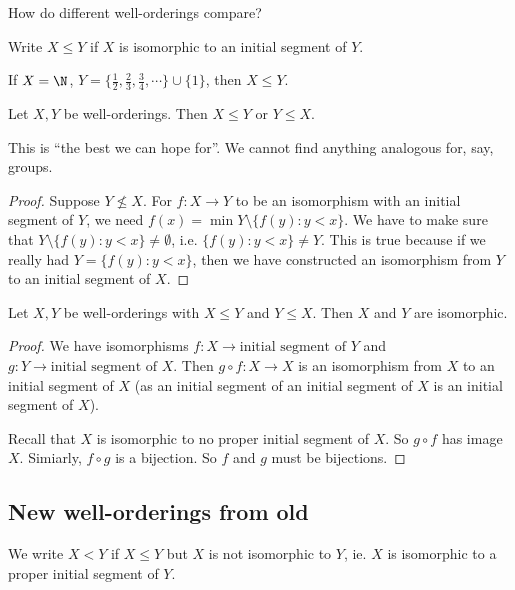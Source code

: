 \documentclass[a4paper]{article}
\begin{document}
How do different well-orderings compare?
\begin{notation}
  Write $X\leq Y$ if $X$ is isomorphic to an initial segment of $Y$.
\end{notation}

\begin{eg}
  If $X = \N$, $Y = \{\frac{1}{2}, \frac{2}{3}, \frac{3}{4},\cdots\}\cup \{1\}$, then $X \leq Y$.
\end{eg}

\begin{thm}
  Let $X, Y$ be well-orderings. Then $X\leq Y$ or $Y \leq X$.

  This is ``the best we can hope for''. We cannot find anything analogous for, say, groups.
\end{thm}

\begin{proof}
  Suppose $Y \not\leq X$. For $f: X\to Y$ to be an isomorphism with an initial segment of $Y$, we need $f(x) = \min Y\setminus \{f(y): y < x\}$. We have to make sure that $Y\setminus \{f(y): y < x\}\not= \emptyset$, i.e. $\{f(y): y < x\} \not= Y$. This is true because if we really had $Y = \{f(y): y < x\}$, then we have constructed an isomorphism from $Y$ to an initial segment of $X$.
\end{proof}

\begin{thm}
  Let $X, Y$ be well-orderings with $X\leq Y$ and $Y \leq X$. Then $X$ and $Y$ are isomorphic.
\end{thm}

\begin{proof}
  We have isomorphisms $f: X\to \text{initial segment of }Y$ and $g: Y\to \text{initial segment of }X$. Then $g\circ f: X\to X$ is an isomorphism from $X$ to an initial segment of $X$ (as an initial segment of an initial segment of $X$ is an initial segment of $X$).

  Recall that $X$ is isomorphic to no proper initial segment of $X$. So $g\circ f$ has image $X$. Simiarly, $f\circ g$ is a bijection. So $f$ and $g$ must be bijections.
\end{proof}

\subsection{New well-orderings from old}
We write $X < Y$ if $X\leq Y$ but $X$ is not isomorphic to $Y$, ie. $X$ is isomorphic to a proper initial segment of $Y$.
\end{document}
